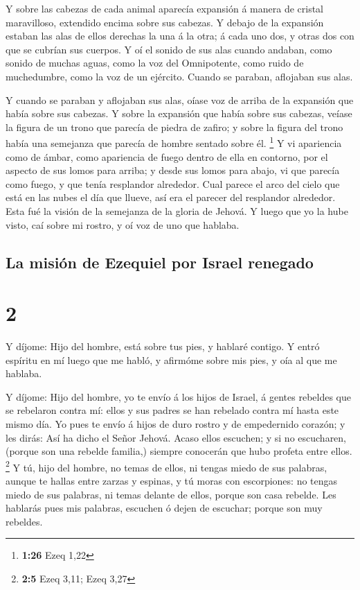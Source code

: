  Y sobre las cabezas de cada animal aparecía expansión á
manera de cristal maravilloso, extendido encima sobre sus cabezas.
 Y debajo de la expansión estaban las alas de ellos
derechas la una á la otra; á cada uno dos, y otras dos con que se
cubrían sus cuerpos.  Y oí el sonido de sus alas cuando
andaban, como sonido de muchas aguas, como la voz del Omnipotente, como
ruido de muchedumbre, como la voz de un ejército. Cuando se paraban,
aflojaban sus alas.

 Y cuando se paraban y aflojaban sus alas, oíase voz de
arriba de la expansión que había sobre sus cabezas.  Y
sobre la expansión que había sobre sus cabezas, veíase la figura de un
trono que parecía de piedra de zafiro; y sobre la figura del trono había
una semejanza que parecía de hombre sentado sobre él. \footnote{\textbf{1:26}
  Ezeq 1,22}  Y vi apariencia como de ámbar, como
apariencia de fuego dentro de ella en contorno, por el aspecto de sus
lomos para arriba; y desde sus lomos para abajo, vi que parecía como
fuego, y que tenía resplandor alrededor.  Cual parece el
arco del cielo que está en las nubes el día que llueve, así era el
parecer del resplandor alrededor. Esta fué la visión de la semejanza de
la gloria de Jehová. Y luego que yo la hube visto, caí sobre mi rostro,
y oí voz de uno que hablaba.

\hypertarget{la-misiuxf3n-de-ezequiel-por-israel-renegado}{%
\subsection{La misión de Ezequiel por Israel
renegado}\label{la-misiuxf3n-de-ezequiel-por-israel-renegado}}

\hypertarget{section-1}{%
\section{2}\label{section-1}}

 Y díjome: Hijo del hombre, está sobre tus pies, y hablaré
contigo.  Y entró espíritu en mí luego que me habló, y
afirmóme sobre mis pies, y oía al que me hablaba.

 Y díjome: Hijo del hombre, yo te envío á los hijos de
Israel, á gentes rebeldes que se rebelaron contra mí: ellos y sus padres
se han rebelado contra mí hasta este mismo día.  Yo pues
te envío á hijos de duro rostro y de empedernido corazón; y les dirás:
Así ha dicho el Señor Jehová.  Acaso ellos escuchen; y si
no escucharen, (porque son una rebelde familia,) siempre conocerán que
hubo profeta entre ellos. \footnote{\textbf{2:5} Ezeq 3,11; Ezeq 3,27}
 Y tú, hijo del hombre, no temas de ellos, ni tengas miedo
de sus palabras, aunque te hallas entre zarzas y espinas, y tú moras con
escorpiones: no tengas miedo de sus palabras, ni temas delante de ellos,
porque son casa rebelde.  Les hablarás pues mis palabras,
escuchen ó dejen de escuchar; porque son muy rebeldes.

